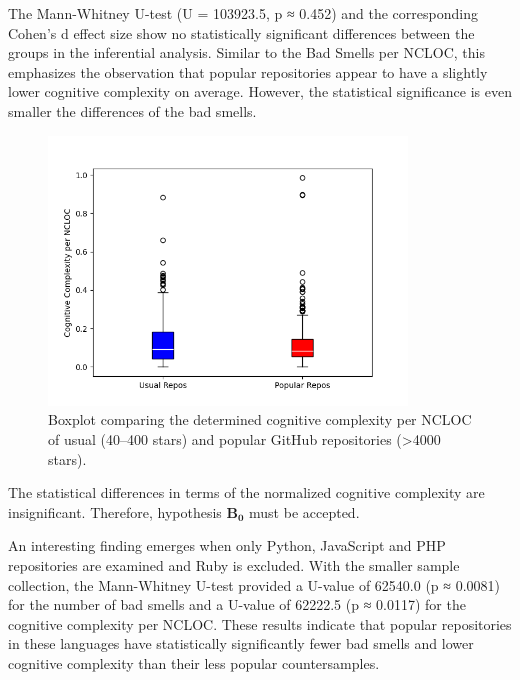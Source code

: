 \documentclass[a4paper, 12pt]{article}
\begin{document}
The Mann-Whitney U-test (U = 103923.5, p ≈ 0.452) and the corresponding Cohen's d effect size show no statistically significant differences between the groups in the inferential analysis. Similar to the Bad Smells per NCLOC, this emphasizes the observation that popular repositories appear to have a slightly lower cognitive complexity on average. However, the statistical significance is even smaller the differences of the bad smells.

\begin{figure}[h]
  \centering
  \includegraphics[width=0.85\textwidth]{../media/cmplx-boxplot.png}
  \caption{Boxplot comparing the determined cognitive complexity per NCLOC of usual (40--400 stars) and popular GitHub repositories (>4000 stars).}
  \label{fig:box-cmplx}
\end{figure}

\vspace{0.5em}
\begin{leftbar}
The statistical differences in terms of the normalized cognitive complexity are insignificant. Therefore, hypothesis $\mathbf{B_0}$ must be accepted. 
\end{leftbar}
\vspace{0.5em}

An interesting finding emerges when only Python, JavaScript and PHP repositories are examined and Ruby is excluded. With the smaller sample collection, the Mann-Whitney U-test provided a U-value of 62540.0 (p ≈ 0.0081) for the number of bad smells and a U-value of 62222.5 (p ≈ 0.0117) for the cognitive complexity per NCLOC. These results indicate that popular repositories in these languages have statistically significantly fewer bad smells and lower cognitive complexity than their less popular countersamples.\\
\end{document}

